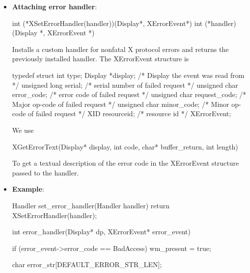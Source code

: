 \documentclass{report}
\begin{document}
    \begin{itemize}
        \item \textbf{Attaching error handler}: 
            \bigbreak \noindent 
            \begin{cppcode}
                int (*XSetErrorHandler(handler))(Display*, XErrorEvent*)
                    int (*handler)(Display *, XErrorEvent *)
            \end{cppcode}
            \bigbreak \noindent
            Installs a custom handler for nonfatal X protocol errors and returns the previously installed handler.
            \bigbreak \noindent 
            The XErrorEvent structure is
            \bigbreak \noindent 
            \begin{cppcode}
                typedef struct {
                    int type;
                    Display *display;                   /* Display the event was read from */
                    unsigned long serial;               /* serial number of failed request */
                    unsigned char error_code;           /* error code of failed request */
                    unsigned char request_code;         /* Major op-code of failed request */
                    unsigned char minor_code;           /* Minor op-code of failed request */
                    XID resourceid;                     /* resource id */
                } XErrorEvent;
            \end{cppcode}
            \bigbreak \noindent 
            We use 
            \bigbreak \noindent 
            \begin{cppcode}
                XGetErrorText(Display* display, int code, char* buffer_return, int length)
            \end{cppcode}
            \bigbreak \noindent 
            To get a textual description of the error code in the XErrorEvent structure passed to the handler.
        \item \textbf{Example}: 
            \bigbreak \noindent 
            \begin{cppcode}
                Handler set_error_handler(Handler handler) {
                    return XSetErrorHandler(handler);
                }

                int error_handler(Display* dp, XErrorEvent* error_event) {
                    if (error_event->error_code == BadAccess) {
                        wm_present = true;
                    }

                    char error_str[DEFAULT_ERROR_STR_LEN];

}
\end{cppcode}
\end{itemize}
\end{document}
